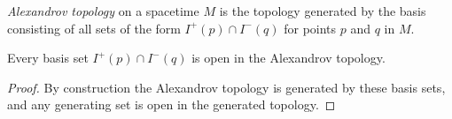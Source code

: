 \begin{definition}
    \label{def:alexandrov-topology}
    \leanok
    \textit{Alexandrov topology} on a spacetime $M$ is the topology generated by the basis consisting of all sets of the form $I^+(p) \cap I^-(q)$ for points $p$ and $q$ in $M$.
\end{definition}

\begin{lemma}
    \label{lmm:alexandrov-basis-open}
    \leanok
    Every basis set $I^+(p) \cap I^-(q)$ is open in the Alexandrov topology.
\end{lemma}
\begin{proof}
    \leanok
    By construction the Alexandrov topology is generated by these basis sets, and any generating set is open in the generated topology.
\end{proof}

